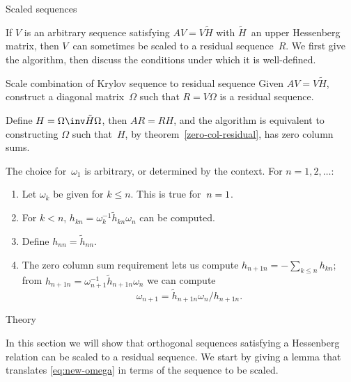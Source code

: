 \documentclass[11pt]{artikel3}
\begin{document}
\begin{Outline}
 {Scaled sequences}
\label{sec:scaled}
\FurtherReading

If $V$ is an arbitrary sequence satisfying $AV=V\tilde H$ with
$\tilde H$~an upper Hessenberg matrix, then $V$~can sometimes be scaled
to a residual sequence~$R$. We first give the algorithm, then discuss
the conditions under which it is well-defined.

\begin{algorithm}{Scale combination of Krylov sequence to residual sequence}
\label{hess-to-res-hess}
Given $AV=V\tilde H$, construct a diagonal matrix~$\Omega$ such that
$R=V\Omega$ is a residual sequence.

Define $H=\Omega\inv \tilde H\Omega$, then $AR=RH$,
and the algorithm is equivalent to constructing
$\Omega$ such that~$H$, 
by theorem~\ref{zero-col-residual},
has zero column sums.

The choice for~$\omega_1$ is arbitrary, or determined by the context.
For $n=1,2,\ldots$:
\begin{enumerate}
\item Let $\omega_k$ be given for $k\leq n$. This is true for~$n=\nobreak1$.
\item For $k<n$, $h_{kn}=\omega_k^{-1}\tilde h_{kn}\omega_n$ can be computed.
\item Define $h_{nn}=\tilde h_{nn}$.
\item  The zero column sum requirement
        lets us compute $h_{n+1n}=-\sum_{k\leq n}h_{kn}$;
        from $h_{n+1n}=\omega_{n+1}^{-1}\tilde h_{n+1n}\omega_n$
        we can compute
    \begin{equation}
     \omega_{n+1}=\tilde h_{n+1n}\omega_n/h_{n+1n}.
        \label{eq:new-omega}\end{equation}
\end{enumerate}
\end{algorithm}

 {Theory}
\label{sec:scaling-theory}

In this section we will show that orthogonal sequences satisfying
a Hessenberg relation can be scaled to a residual sequence.
We start by giving a lemma that translates \eqref{eq:new-omega}
in terms of the sequence to be scaled.


\end{Outline}
\end{document}

